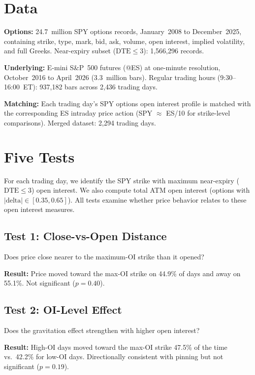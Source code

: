 \documentclass[11pt]{article}
\begin{document}
\section{Data}

\textbf{Options:} 24.7~million SPY options records, January~2008 to December~2025, containing strike, type, mark, bid, ask, volume, open interest, implied volatility, and full Greeks. Near-expiry subset ($\text{DTE} \leq 3$): 1{,}566{,}296 records.

\textbf{Underlying:} E-mini S\&P~500 futures (@ES) at one-minute resolution, October~2016 to April~2026 (3.3~million bars). Regular trading hours (9:30--16:00~ET): 937{,}182 bars across 2{,}436 trading days.

\textbf{Matching:} Each trading day's SPY options open interest profile is matched with the corresponding ES intraday price action (SPY $\approx$ ES/10 for strike-level comparisons). Merged dataset: 2{,}294 trading days.

\section{Five Tests}

For each trading day, we identify the SPY strike with maximum near-expiry ($\text{DTE} \leq 3$) open interest. We also compute total ATM open interest (options with $|\text{delta}| \in [0.35, 0.65]$). All tests examine whether price behavior relates to these open interest measures.

\subsection{Test 1: Close-vs-Open Distance}

Does price close nearer to the maximum-OI strike than it opened?

\textbf{Result:} Price moved toward the max-OI strike on 44.9\% of days and away on 55.1\%. Not significant ($p = 0.40$).

\subsection{Test 2: OI-Level Effect}

Does the gravitation effect strengthen with higher open interest?

\textbf{Result:} High-OI days moved toward the max-OI strike 47.5\% of the time vs.\ 42.2\% for low-OI days. Directionally consistent with pinning but not significant ($p = 0.19$).
\end{document}
